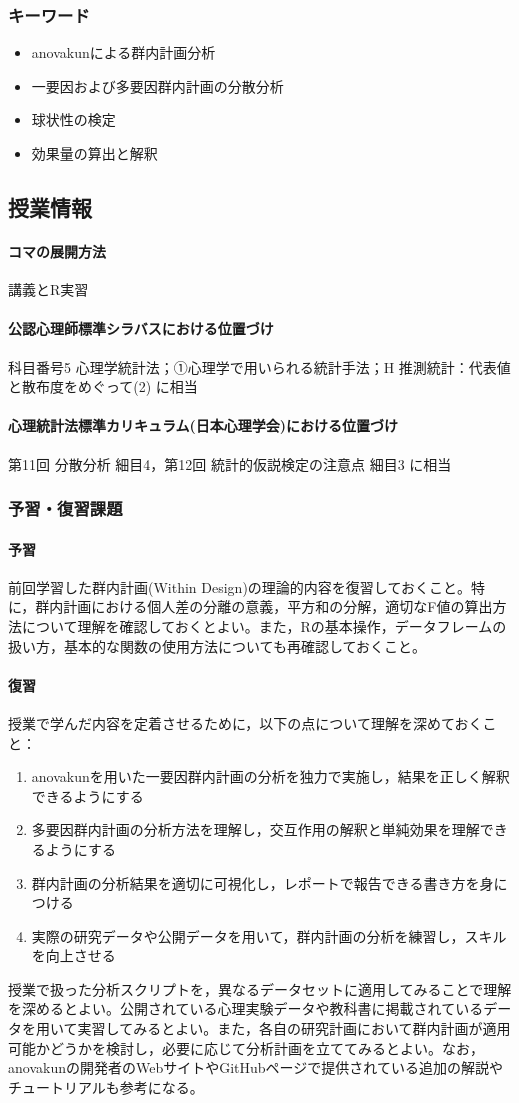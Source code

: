 \subsubsection{キーワード}
\begin{itemize}
	\item anovakunによる群内計画分析 
	\item 一要因および多要因群内計画の分散分析
	\item 球状性の検定
	\item 効果量の算出と解釈
\end{itemize}
\subsection{授業情報}
\paragraph{コマの展開方法}
講義とR実習
\paragraph{公認心理師標準シラバスにおける位置づけ}
科目番号5 心理学統計法；①心理学で用いられる統計手法；H 推測統計：代表値と散布度をめぐって(2) に相当
\paragraph{心理統計法標準カリキュラム(日本心理学会)における位置づけ}
第11回 分散分析 細目4，第12回 統計的仮説検定の注意点 細目3 に相当
\subsubsection{予習・復習課題}
\paragraph{予習}
前回学習した群内計画(Within Design)の理論的内容を復習しておくこと。特に，群内計画における個人差の分離の意義，平方和の分解，適切なF値の算出方法について理解を確認しておくとよい。また，Rの基本操作，データフレームの扱い方，基本的な関数の使用方法についても再確認しておくこと。

\paragraph{復習}
授業で学んだ内容を定着させるために，以下の点について理解を深めておくこと：

\begin{enumerate}
\item anovakunを用いた一要因群内計画の分析を独力で実施し，結果を正しく解釈できるようにする 
\item 多要因群内計画の分析方法を理解し，交互作用の解釈と単純効果を理解できるようにする
 \item 群内計画の分析結果を適切に可視化し，レポートで報告できる書き方を身につける
\item 実際の研究データや公開データを用いて，群内計画の分析を練習し，スキルを向上させる
\end{enumerate}

授業で扱った分析スクリプトを，異なるデータセットに適用してみることで理解を深めるとよい。公開されている心理実験データや教科書に掲載されているデータを用いて実習してみるとよい。また，各自の研究計画において群内計画が適用可能かどうかを検討し，必要に応じて分析計画を立ててみるとよい。なお，anovakunの開発者のWebサイトやGitHubページで提供されている追加の解説やチュートリアルも参考になる。